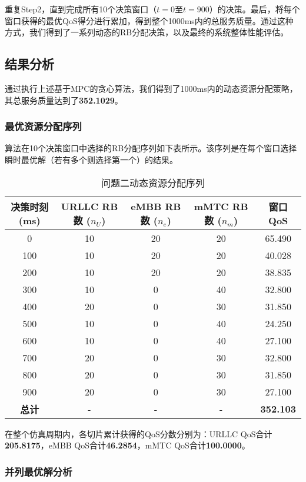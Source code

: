 重复Step2，直到完成所有10个决策窗口（$t=0$至$t=900$）的决策。最后，将每个窗口获得的最优QoS得分进行累加，得到整个1000ms内的总服务质量。通过这种方式，我们得到了一系列动态的RB分配决策，以及最终的系统整体性能评估。

\subsection{结果分析}

通过执行上述基于MPC的贪心算法，我们得到了1000ms内的动态资源分配策略，其总服务质量达到了\textbf{352.1029}。

\subsubsection{最优资源分配序列}

算法在10个决策窗口中选择的RB分配序列如下表所示。该序列是在每个窗口选择瞬时最优解（若有多个则选择第一个）的结果。

\begin{table}[H]
\centering
\caption{问题二动态资源分配序列}
\label{tab:q2_decision_sequence}
\begin{tabular}{ccccc}
\hline
\textbf{决策时刻 (ms)} & \textbf{URLLC RB数 ($n_U$)} & \textbf{eMBB RB数 ($n_e$)} & \textbf{mMTC RB数 ($n_m$)} & \textbf{窗口QoS} \\
\hline
0 & 10 & 20 & 20 & 65.490 \\
100 & 10 & 20 & 20 & 40.028 \\
200 & 10 & 20 & 20 & 38.835 \\
300 & 10 & 0 & 40 & 32.800 \\
400 & 20 & 0 & 30 & 31.850 \\
500 & 10 & 0 & 40 & 24.250 \\
600 & 10 & 0 & 40 & 27.100 \\
700 & 20 & 0 & 30 & 32.800 \\
800 & 20 & 0 & 30 & 31.850 \\
900 & 20 & 0 & 30 & 27.100 \\
\hline
\textbf{总计} & - & - & - & \textbf{352.103} \\
\hline
\end{tabular}
\end{table}

在整个仿真周期内，各切片累计获得的QoS分数分别为：URLLC QoS合计\textbf{205.8175}，eMBB QoS合计\textbf{46.2854}，mMTC QoS合计\textbf{100.0000}。

\subsubsection{并列最优解分析}

